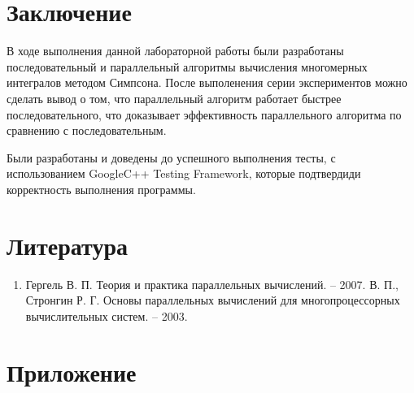 \documentclass{report}
\begin{document}
\section*{Заключение}
В ходе выполнения данной лабораторной работы были разработаны последовательный и параллельный алгоритмы вычисления многомерных интегралов методом Симпсона. После выполенения серии экспериментов можно сделать вывод о том, что параллельный алгоритм работает быстрее последовательного, что доказывает эффективность параллельного алгоритма по сравнению с последовательным.
\par Были разработаны и доведены до успешного выполнения тесты,  с использованием GoogleC++ Testing Framework, которые  подтвердиди корректность выполнения  программы.
\newpage

\section*{Литература}
\begin{enumerate}
\item Гергель В. П. Теория и практика параллельных вычислений. – 2007.
 В. П., Стронгин Р. Г. Основы параллельных вычислений для многопроцессорных вычислительных систем. – 2003.

\end{enumerate} 
\newpage

\section*{Приложение}
\end{document}
